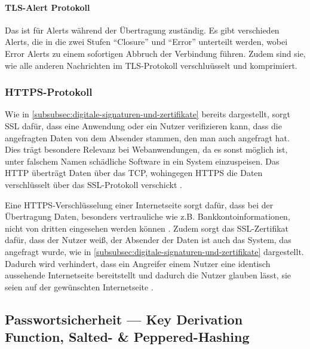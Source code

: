 \paragraph[TLS-Alert Protokoll]{\ac{TLS}-Alert Protokoll}\label{par:tls_alert_protocol}

Das  ist für Alerts während der Übertragung zuständig. Es gibt verschieden Alerts, die in die zwei Stufen \enquote{Closure} und \enquote{Error} unterteilt werden, wobei Error Alerts zu einem sofortigen Abbruch der Verbindung führen.\autocite[\vglf][]{Transpor18:online} Zudem sind sie, wie alle anderen Nachrichten im \ac{TLS}-Protokoll verschluüsselt und komprimiert.\autocite[\vglf][]{RFC8446}

\subsubsection[HTTPS-Protocol]{\ac{HTTPS}-Protokoll}\label{subsubsec:HTTPS-Protocol}

Wie in \autoref{subsubsec:digitale-signaturen-und-zertifikate} bereits dargestellt, sorgt \ac{SSL} dafür, dass eine Anwendung oder ein Nutzer verifizieren kann, dass die angefragten Daten von dem Absender stammen, den man auch angefragt hat. Dies trägt besondere Relevanz bei Webanwendungen, da es sonst möglich ist, unter falschem Namen schädliche Software in ein System einzuspeisen.
Das \ac{HTTP} überträgt Daten über das \ac{TCP}, wohingegen \ac{HTTPS} die Daten verschlüsselt über das \ac{SSL}-Protokoll verschickt \autocites{2674005.2674991:online}{RFC5246T44:online}.

Eine \ac{HTTPS}-Verschlüsselung einer Internetseite sorgt dafür, dass bei der Übertragung Daten, besonders vertrauliche wie z.B. Bankkontoinformationen, nicht von dritten eingesehen werden können \autocite[\vglf][]{CloudfareWarumHTTPS:online}. Zudem sorgt das \ac{SSL}-Zertifikat dafür, dass der Nutzer weiß, der Absender der Daten ist auch das System, das angefragt wurde, wie in \autoref{subsubsec:digitale-signaturen-und-zertifikate} dargestellt. Dadurch wird verhindert, dass ein Angreifer einem Nutzer eine identisch aussehende Internetseite bereitstellt und dadurch die Nutzer glauben lässt, sie seien auf der gewünschten Internetseite \autocite[\vglf][]{CloudfareWarumHTTPS:online}.

\subsection[Passwortsicherheit]{Passwortsicherheit — Key Derivation Function, Salted- \& Peppered-Hashing}\label{subsec:passwortsicherheit}

